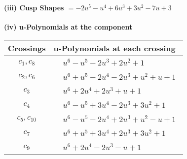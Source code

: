 \documentclass[1p]{elsarticle_modified}
\theoremstyle{definition}
\begin{document}
\flushleft \textbf{(iii) Cusp Shapes $= -2 u^5- u^4+6 u^3+3 u^2-7 u+3$}\\~\\
\newpage\renewcommand{\arraystretch}{1}
\flushleft \textbf{(iv) u-Polynomials at the component}\newline \\
\begin{tabular}{m{50pt}|m{274pt}}
Crossings & \hspace{64pt}u-Polynomials at each crossing \\
\hline $$\begin{aligned}c_{1},c_{8}\end{aligned}$$&$\begin{aligned}
&u^6- u^5-2 u^3+2 u^2+1
\end{aligned}$\\
\hline $$\begin{aligned}c_{2},c_{6}\end{aligned}$$&$\begin{aligned}
&u^6+u^5-2 u^4-2 u^3+u^2+u+1
\end{aligned}$\\
\hline $$\begin{aligned}c_{3}\end{aligned}$$&$\begin{aligned}
&u^6+2 u^4+2 u^3+u+1
\end{aligned}$\\
\hline $$\begin{aligned}c_{4}\end{aligned}$$&$\begin{aligned}
&u^6- u^5+3 u^4-2 u^3+3 u^2+1
\end{aligned}$\\
\hline $$\begin{aligned}c_{5},c_{10}\end{aligned}$$&$\begin{aligned}
&u^6- u^5-2 u^4+2 u^3+u^2- u+1
\end{aligned}$\\
\hline $$\begin{aligned}c_{7}\end{aligned}$$&$\begin{aligned}
&u^6+u^5+3 u^4+2 u^3+3 u^2+1
\end{aligned}$\\
\hline $$\begin{aligned}c_{9}\end{aligned}$$&$\begin{aligned}
&u^6+2 u^4-2 u^3- u+1
\end{aligned}$\\
\hline
\end{tabular}\\~\\
\end{document}
